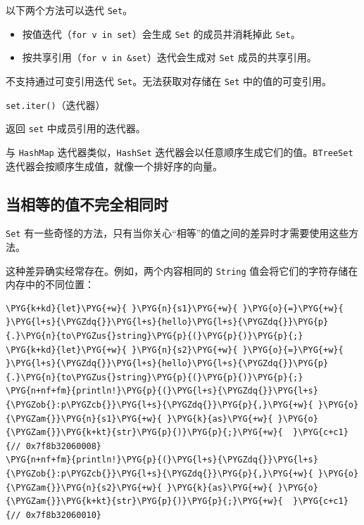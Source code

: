 以下两个方法可以迭代 \texttt{Set}。

\begin{itemize}
\item 按值迭代（\texttt{for v in set}）会生成 \texttt{Set} 的成员并消耗掉此 \texttt{Set}。
\item 按共享引用（\texttt{for v in \&set}）迭代会生成对 \texttt{Set} 成员的共享引用。
\end{itemize}

不支持通过可变引用迭代 \texttt{Set}。无法获取对存储在 \texttt{Set} 中的值的可变引用。

\begin{mySidenote}
\texttt{set.iter()}（迭代器）
\end{mySidenote}

返回 \texttt{set} 中成员引用的迭代器。

与 \texttt{HashMap} 迭代器类似，\texttt{HashSet} 迭代器会以任意顺序生成它们的值。\texttt{BTreeSet} 迭代器会按顺序生成值，就像一个排好序的向量。

\subsection{当相等的值不完全相同时}

\texttt{Set} 有一些奇怪的方法，只有当你关心“相等”的值之间的差异时才需要使用这些方法。

这种差异确实经常存在。例如，两个内容相同的 \texttt{String} 值会将它们的字符存储在内存中的不同位置：

\begin{Verbatim}[commandchars=\\\{\},breaklines=true,breakanywhere=true,fontsize=\codefont,xleftmargin=17bp]
\PYG{k+kd}{let}\PYG{+w}{ }\PYG{n}{s1}\PYG{+w}{ }\PYG{o}{=}\PYG{+w}{ }\PYG{l+s}{\PYGZdq{}}\PYG{l+s}{hello}\PYG{l+s}{\PYGZdq{}}\PYG{p}{.}\PYG{n}{to\PYGZus{}string}\PYG{p}{(}\PYG{p}{)}\PYG{p}{;}
\PYG{k+kd}{let}\PYG{+w}{ }\PYG{n}{s2}\PYG{+w}{ }\PYG{o}{=}\PYG{+w}{ }\PYG{l+s}{\PYGZdq{}}\PYG{l+s}{hello}\PYG{l+s}{\PYGZdq{}}\PYG{p}{.}\PYG{n}{to\PYGZus{}string}\PYG{p}{(}\PYG{p}{)}\PYG{p}{;}
\PYG{n+nf+fm}{println!}\PYG{p}{(}\PYG{l+s}{\PYGZdq{}}\PYG{l+s}{\PYGZob{}:p\PYGZcb{}}\PYG{l+s}{\PYGZdq{}}\PYG{p}{,}\PYG{+w}{ }\PYG{o}{\PYGZam{}}\PYG{n}{s1}\PYG{+w}{ }\PYG{k}{as}\PYG{+w}{ }\PYG{o}{\PYGZam{}}\PYG{k+kt}{str}\PYG{p}{)}\PYG{p}{;}\PYG{+w}{  }\PYG{c+c1}{// 0x7f8b32060008}
\PYG{n+nf+fm}{println!}\PYG{p}{(}\PYG{l+s}{\PYGZdq{}}\PYG{l+s}{\PYGZob{}:p\PYGZcb{}}\PYG{l+s}{\PYGZdq{}}\PYG{p}{,}\PYG{+w}{ }\PYG{o}{\PYGZam{}}\PYG{n}{s2}\PYG{+w}{ }\PYG{k}{as}\PYG{+w}{ }\PYG{o}{\PYGZam{}}\PYG{k+kt}{str}\PYG{p}{)}\PYG{p}{;}\PYG{+w}{  }\PYG{c+c1}{// 0x7f8b32060010}
\end{Verbatim}

